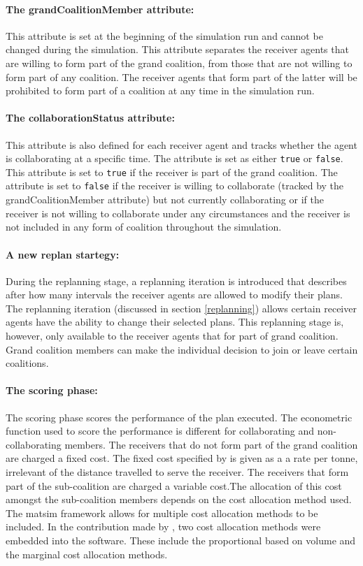 \paragraph{The grandCoalitionMember attribute:} This attribute is set at the beginning of the simulation run and cannot be changed during the simulation. This attribute separates the receiver agents that are willing to form part of the grand coalition, from those that are not willing to form part of any coalition. The receiver agents that form part of the latter will be prohibited to form part of a coalition at any time in the simulation run.

\paragraph{The collaborationStatus attribute:} This attribute is also defined for each receiver agent and tracks whether the agent is collaborating at a specific time. The attribute is set as either \texttt{true} or \texttt{false}. This attribute is set to \texttt{true} if the receiver is part of the grand coalition. The attribute is set to \texttt{false} if the receiver is willing to collaborate (tracked by the grandCoalitionMember attribute) but not currently collaborating or if the receiver is not willing to collaborate under any circumstances and the receiver is not included in any form of coalition throughout the simulation.

\paragraph{A new replan startegy:} During the replanning stage, a replanning iteration is introduced that describes after how many intervals the receiver agents are allowed to modify their plans. The replanning iteration (discussed in section \ref{replanning}) allows certain receiver agents have the ability to change their selected plans. This replanning stage is, however, only available to the receiver agents that for part of grand coalition. Grand coalition members can make the individual decision to join or leave certain coalitions. 

\paragraph{The scoring phase:} The scoring phase scores the performance of the plan executed. The econometric function used to score the performance is different for collaborating and non-collaborating members. The receivers that do not form part of the grand coalition are charged a fixed cost. The fixed cost specified by \citet{bean2020behavioural} is given as a a rate per tonne, irrelevant of the distance travelled to serve the receiver. The receivers that form part of the sub-coalition are charged a variable cost.The allocation of this cost amongst the sub-coalition members depends on the cost allocation method used. The \acrshort{matsim} framework allows for multiple cost allocation methods to be included. In the contribution made by \citet{bean2020behavioural}, two cost allocation methods were embedded into the software. These include the proportional based on volume and the marginal cost allocation methods.

